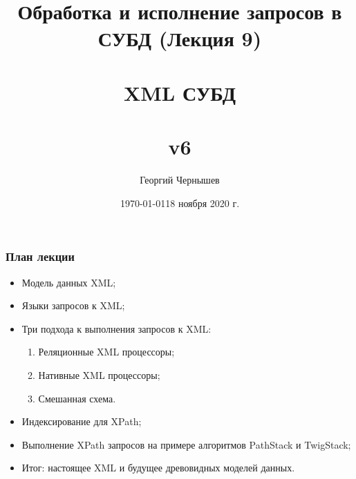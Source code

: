 \documentclass{beamer}
\title[Обработка и исполнение запросов: лекция 9]{Обработка и исполнение запросов в СУБД (Лекция 9) \\~\\ XML СУБД\\~\\ v6} %
\author{Георгий Чернышев} %
\institute[ВШЭ] %
{
Высшая Школа Экономики \\ %
\medskip
\textit{chernishev@gmail.com} %
}
\date{\today} %
\date{18 ноября 2020 г.}
\begin{document}
\begin{frame}
\titlepage %
\end{frame}

\begin{frame}
\frametitle{План лекции}

\begin{itemize}
  \setlength\itemsep{1em}
  \item Модель данных XML;
  \item Языки запросов к XML;
  \item Три подхода к выполнения запросов к XML: 
  \begin{enumerate}
    \item Реляционные XML процессоры;
    \item Нативные XML процессоры;
    \item Смешанная схема.
  \end{enumerate}
  \item Индексирование для XPath;
  \item Выполнение XPath запросов на примере алгоритмов PathStack и TwigStack;
  \item Итог: настоящее XML и будущее древовидных моделей данных.
\end{itemize}
\end{frame}
\end{document}
